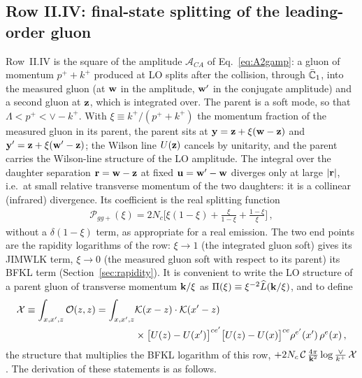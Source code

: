 \subsection{Row II.IV: final-state splitting of the leading-order gluon}\label{sec:dg_origin}

Row~II.IV is the square of the amplitude $\mathcal A_{CA}$ of Eq.~\eqref{eq:A2gamp}: a gluon of momentum $p^++k^+$ produced at LO splits after the collision, through $\bar{\mathbb{C}}_1$, into the measured gluon (at $\mathbf{w}$ in the amplitude, $\mathbf{w}'$ in the conjugate amplitude) and a second gluon at $\mathbf{z}$, which is integrated over. The parent is a soft mode, so that $\Lambda<p^+<\vee-k^+$. With $\xi\equiv k^+/(p^++k^+)$ the momentum fraction of the measured gluon in its parent, the parent sits at $\mathbf{y}=\mathbf{z}+\xi(\mathbf{w}-\mathbf{z})$ and $\mathbf{y}'=\mathbf{z}+\xi(\mathbf{w}'-\mathbf{z})$; the Wilson line $U(\mathbf{z})$ cancels by unitarity, and the parent carries the Wilson-line structure of the LO amplitude. The integral over the daughter separation $\mathbf{r}=\mathbf{w}-\mathbf{z}$ at fixed $\mathbf{u}=\mathbf{w}'-\mathbf{w}$ diverges only at large $|\mathbf{r}|$, i.e.\ at small relative transverse momentum of the two daughters: it is a collinear (infrared) divergence. Its coefficient is the real splitting function
\begin{align}\label{eq:Pggplus}
\mathcal P_{gg+}(\xi)=2N_c\Big[\xi(1-\xi)+\frac{\xi}{1-\xi}+\frac{1-\xi}{\xi}\Big]\,,
\end{align}
without a $\delta(1-\xi)$ term, as appropriate for a real emission. The two end points are the rapidity logarithms of the row: $\xi\to1$ (the integrated gluon soft) gives its JIMWLK term, $\xi\to0$ (the measured gluon soft with respect to its parent) its BFKL term (Section~\ref{sec:rapidity}). It is convenient to write the LO structure of a parent gluon of transverse momentum $\mathbf{k}/\xi$ as $\Pi(\xi)\equiv\xi^{-2}\widehat L(\mathbf{k}/\xi)$, and to define
\begin{align}\label{eq:dg_X}
\mathcal X\equiv\int_{x,x',z}\mathcal O(z,z)=\int_{x,x',z}&\mathcal{K}(x-z)\cdot\mathcal{K}(x'-z)\notag\\&\times\big[U(z)-U(x')\big]^{ce'}\big[U(z)-U(x)\big]^{ce}\rho^{e'}(x')\,\rho^e(x)\,,
\end{align}
the structure that multiplies the BFKL logarithm of this row, $+2N_c\,\mathcal C\,\frac{4\pi}{\mathbf{k}^2}\log\frac{\vee}{k^+}\,\mathcal X$. The derivation of these statements is as follows.

